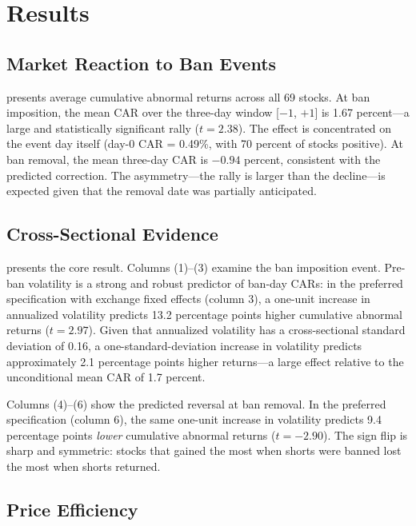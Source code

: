 \documentclass[12pt]{article}
\begin{document}
\section{Results}
\label{sec:results}

\subsection{Market Reaction to Ban Events}



 presents average cumulative abnormal returns across all 69 stocks. At ban imposition, the mean CAR over the three-day window [$-1$, $+1$] is 1.67 percent---a large and statistically significant rally ($t = 2.38$). The effect is concentrated on the event day itself (day-0 CAR = 0.49\%, with 70 percent of stocks positive). At ban removal, the mean three-day CAR is $-0.94$ percent, consistent with the predicted correction. The asymmetry---the rally is larger than the decline---is expected given that the removal date was partially anticipated.

\subsection{Cross-Sectional Evidence}



 presents the core result. Columns (1)--(3) examine the ban imposition event. Pre-ban volatility is a strong and robust predictor of ban-day CARs: in the preferred specification with exchange fixed effects (column 3), a one-unit increase in annualized volatility predicts 13.2 percentage points higher cumulative abnormal returns ($t = 2.97$). Given that annualized volatility has a cross-sectional standard deviation of 0.16, a one-standard-deviation increase in volatility predicts approximately 2.1 percentage points higher returns---a large effect relative to the unconditional mean CAR of 1.7 percent.

Columns (4)--(6) show the predicted reversal at ban removal. In the preferred specification (column 6), the same one-unit increase in volatility predicts 9.4 percentage points \textit{lower} cumulative abnormal returns ($t = -2.90$). The sign flip is sharp and symmetric: stocks that gained the most when shorts were banned lost the most when shorts returned.

\subsection{Price Efficiency}
\end{document}
